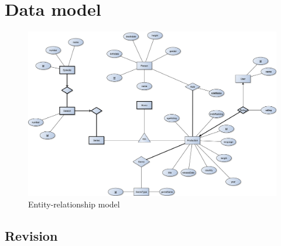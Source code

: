 \section{Data model}
\FloatBarrier
\begin{figure}[ht]
	\centering
	\centerline{\includegraphics[scale=0.35]{figures/ERD.pdf}}
	\caption{Entity-relationship model}
\end{figure}
\FloatBarrier

\subsection{Revision}